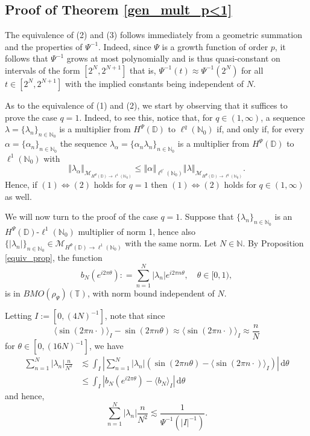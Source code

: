 \documentclass[a4paper, leqno, 10pt]{amsart}
\numberwithin{equation}{section}
\newcommand{\dd}{\mathrm{d}}
\newcommand{\T}{\mathbb{T}}
\newcommand{\norm}[1]{\left\Vert#1\right\Vert}
\newcommand{\D}{\mathbb{D}}
\newcommand{\N}{\mathbb{N}}
\begin{document}
%
\subsection{Proof of Theorem \ref{gen_mult_p<1}}
The equivalence of (2) and (3) follows immediately from a geometric summation and the properties of $\Psi^{-1}$. Indeed, since $\Psi$ is a growth function of order $p$, it follows that $\Psi^{-1}$ grows at most polynomially and is thus quasi-constant on intervals of the form $[2^N, 2^{N+1}]$ that is, $\Psi^{-1} (t) \approx \Psi^{-1} (2^N) $ for all $t \in [2^N, 2^{N+1}]$ with the implied constants being independent of $N$. 

As to the equivalence of (1) and (2), we start by observing that it suffices to prove the case $q =1$. Indeed, to see this, notice that, for $q \in (1, \infty)$, a sequence $\lambda = \{ \lambda_n \}_{n \in \N_0}$ is a multiplier from $H^{\Psi} (\D)$ to $\ell^q (\N_0)$ if, and only if, for every $\alpha = \{ \alpha_n \}_{n \in \N_0}$ the sequence $\lambda_{\alpha} = \{ \alpha_n \lambda_n \}_{n \in \N_0}$ is a multiplier from $H^{\Psi} (\D)$ to $\ell^1 (\N_0)$ with
\[
\norm{ \lambda_{\alpha} }_{\mathcal{M}_{H^{\Psi} (\D) \rightarrow \ell^1 (\N_0)}} \leq \norm{\alpha}_{\ell^{q'} (\N_0)} \norm{ \lambda }_{\mathcal{M}_{H^{\Psi} (\D) \rightarrow \ell^q (\N_0)}}. 
\]
Hence, if $(1) \Leftrightarrow (2)$ holds for $q=1$ then $(1) \Leftrightarrow (2)$ holds for $q \in (1, \infty)$ as well.

We will now turn to the proof of the case $q=1$.
Suppose that $\{ \lambda_n \}_{n \in \N_0}$ is an $H^{\Psi}(\D)$-$\ell^1 (\N_0)$ multiplier of norm 1, hence
also $\{ |\lambda_n|\}_{n \in \N_0} \in \mathcal{M}_{H^{\Psi}(\D) \rightarrow \ell^1 (\N_0)}$ with the same norm. Let $N \in \N$. By Proposition 
\ref{equiv_prop}, the function
\[
b_N( e^{i 2\pi \theta} ) : = \sum_{n=1}^N |\lambda_n| e^{i 2\pi n \theta}, \quad \theta \in [0,1),
\]
is in $BMO (\rho_{\Psi}) (\T)$, with norm bound independent of $N$.

Letting $I := [0, (4N)^{-1}]$, note that
since 
\begin{equation}    \label{eq:sinestimate}
 \langle \sin(2\pi n \cdot) \rangle_I - \sin(2\pi n \theta) \approx \langle \sin(2\pi n \cdot) \rangle_I  \approx \frac{n}{N}
\end{equation}
for $\theta \in [0,(16N)^{-1}]$, we have
\begin{align*} %
\sum_{n=1}^N |\lambda_n| \frac{n}{N^{2}} & \lesssim \int_I \left|\sum_{n=1}^N |\lambda_n| \left(\sin(2 \pi n \theta ) - \langle \sin(2\pi n \cdot) \rangle_I  \right)   \right| \, \dd \theta  \\
& \leq \int_I | b_N( e^{i 2\pi \theta} ) - \langle b_N \rangle_I | \, \dd \theta 
\end{align*}
and hence,
\begin{equation}\label{eq:osclow}
\sum_{n=1}^N |\lambda_n| \frac{n}{N^{2}}  \lesssim \frac{1}{\Psi^{-1}(|I|^{-1})}. 
\end{equation}
\end{document}
